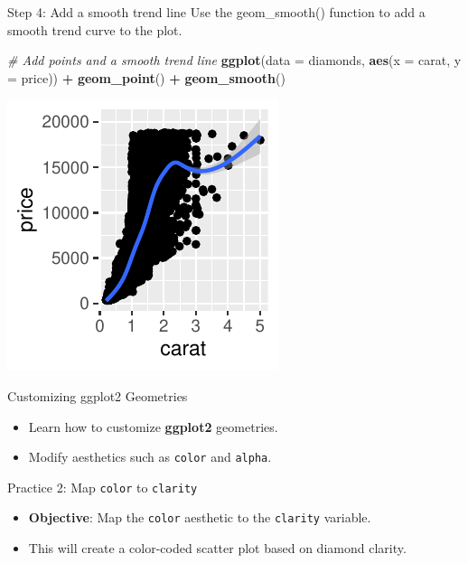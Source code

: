 \documentclass[
  ignorenonframetext,
]{beamer}
\newenvironment{Shaded}{\begin{snugshade}}{\end{snugshade}}
\newcommand{\AttributeTok}[1]{\textcolor[rgb]{0.13,0.29,0.53}{#1}}
\newcommand{\CommentTok}[1]{\textcolor[rgb]{0.56,0.35,0.01}{\textit{#1}}}
\newcommand{\FunctionTok}[1]{\textcolor[rgb]{0.13,0.29,0.53}{\textbf{#1}}}
\newcommand{\NormalTok}[1]{#1}
\newcommand{\SpecialCharTok}[1]{\textcolor[rgb]{0.81,0.36,0.00}{\textbf{#1}}}
\providecommand{\tightlist}{%
  \setlength{\itemsep}{0pt}\setlength{\parskip}{0pt}}
\begin{document}
\begin{frame}[fragile]{Step 4: Add a smooth trend line}
\label{step-4-add-a-smooth-trend-line}
Use the geom\_smooth() function to add a smooth trend curve to the plot.


\begin{Shaded}
\begin{Highlighting}[]
\CommentTok{\# Add points and a smooth trend line}
\FunctionTok{ggplot}\NormalTok{(}\AttributeTok{data =}\NormalTok{ diamonds, }\FunctionTok{aes}\NormalTok{(}\AttributeTok{x =}\NormalTok{ carat, }\AttributeTok{y =}\NormalTok{ price)) }\SpecialCharTok{+} \FunctionTok{geom\_point}\NormalTok{() }\SpecialCharTok{+}
    \FunctionTok{geom\_smooth}\NormalTok{()}
\end{Highlighting}
\end{Shaded}

\begin{center}\includegraphics[width=0.5\linewidth]{Figs/unnamed-chunk-4-1} \end{center}
\end{frame}

\begin{frame}[fragile]{Customizing ggplot2 Geometries}
\label{customizing-ggplot2-geometries}
\begin{itemize}
\tightlist
\item
  Learn how to customize \textbf{ggplot2} geometries.
\item
  Modify aesthetics such as \texttt{color} and \texttt{alpha}.
\end{itemize}
\end{frame}

\begin{frame}[fragile]{Practice 2: Map \texttt{color} to
\texttt{clarity}}
\label{practice-2-map-color-to-clarity}
\begin{itemize}
\tightlist
\item
  \textbf{Objective}: Map the \texttt{color} aesthetic to the
  \texttt{clarity} variable.
\item
  This will create a color-coded scatter plot based on diamond clarity.
\end{itemize}
\end{frame}
\end{document}
